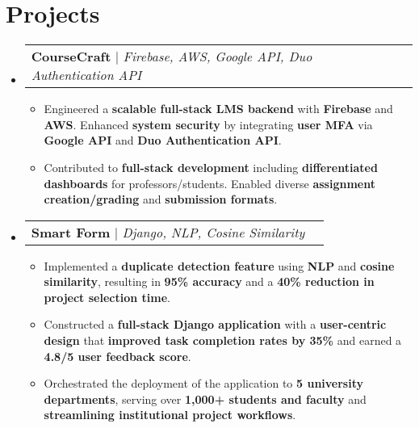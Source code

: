 \documentclass[letterpaper,10pt]{article}
\makeatletter
\newcommand{\resumeItem}[1]{
  \item\small{
    {#1 \vspace{-3pt}}
  }
}
\newcommand{\resumeProjectHeading}[2]{
    \item
    \begin{tabular*}{0.97\textwidth}{l@{\extracolsep{\fill}}r}
      \small#1 & #2 \\
    \end{tabular*}\vspace{-7pt}
}
\newcommand{\resumeSubHeadingListStart}{\begin{itemize}[leftmargin=0.15in, label={}]}
\newcommand{\resumeSubHeadingListEnd}{\end{itemize}\vspace{-4pt}}
\newcommand{\resumeItemListStart}{\begin{itemize}}
\newcommand{\resumeItemListEnd}{\end{itemize}\vspace{-6pt}}
\makeatother
\begin{document}
\section{Projects}
    \vspace{-2pt}
    \resumeSubHeadingListStart
        \resumeProjectHeading
          {\textbf{CourseCraft} $|$ \emph{Firebase, AWS, Google API, Duo Authentication API}}{}
          \vspace{-8pt}
          \resumeItemListStart
            \resumeItem{Engineered a \textbf{scalable full-stack LMS backend} with \textbf{Firebase} and \textbf{AWS}. Enhanced \textbf{system security} by integrating \textbf{user MFA} via \textbf{Google API} and \textbf{Duo Authentication API}.}
            \resumeItem{Contributed to \textbf{full-stack development} including \textbf{differentiated dashboards} for professors/students. Enabled diverse \textbf{assignment creation/grading} and \textbf{submission formats}.}
          \resumeItemListEnd
\vspace{5pt}
        \resumeProjectHeading
          {\textbf{Smart Form} $|$ \emph{Django, NLP, Cosine Similarity}}{}
          \vspace{-8pt}
          \resumeItemListStart
            \resumeItem{Implemented a \textbf{duplicate detection feature} using \textbf{NLP} and \textbf{cosine similarity}, resulting in \textbf{95\% accuracy} and a \textbf{40\% reduction in project selection time}.}
            \resumeItem{Constructed a \textbf{full-stack Django application} with a \textbf{user-centric design} that \textbf{improved task completion rates by 35\%} and earned a \textbf{4.8/5 user feedback score}.}
            \resumeItem{Orchestrated the deployment of the application to \textbf{5 university departments}, serving over \textbf{1,000+ students and faculty} and \textbf{streamlining institutional project workflows}.}
          \resumeItemListEnd
    \resumeSubHeadingListEnd
\vspace{-0.4cm}
\end{document}
